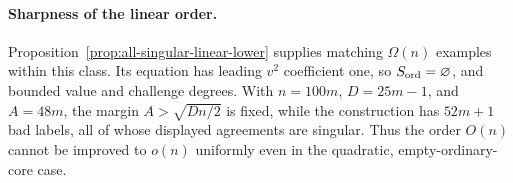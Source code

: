 \paragraph{Sharpness of the linear order.}
Proposition~\ref{prop:all-singular-linear-lower} supplies matching
$\Omega(n)$ examples within this class.  Its equation has leading
$v^2$ coefficient one, so $S_{\rm ord}=\varnothing$, and bounded
value and challenge degrees.  With $n=100m$, $D=25m-1$, and $A=48m$,
the margin $A>\sqrt{Dn/2}$ is fixed, while the construction has
$52m+1$ bad labels, all of whose displayed agreements are singular.
Thus the order $O(n)$ cannot be improved to $o(n)$ uniformly even
in the quadratic, empty-ordinary-core case.










